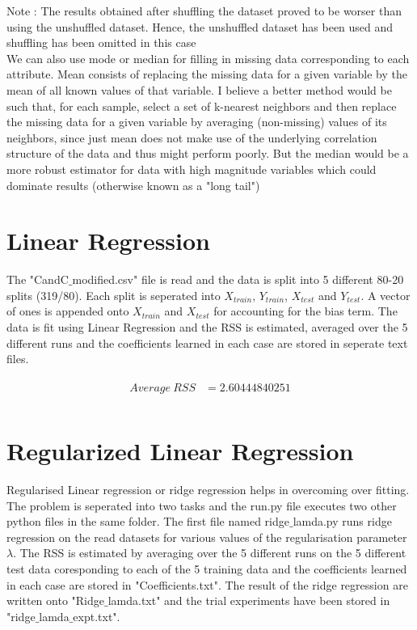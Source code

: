 \documentclass[paper=a4, fontsize=11pt]{scrartcl}
\numberwithin{equation}{section}		%
\numberwithin{figure}{section}			%
\numberwithin{table}{section}				%
\begin{document}
Note : The results obtained after shuffling the dataset proved to be worser than using the unshuffled dataset. Hence, the unshuffled dataset has been used and shuffling has been omitted in this case\\

We can also use mode or median for filling in missing data corresponding to each attribute. Mean consists of replacing the missing data for a given variable by the mean of all known values of that variable. I believe a better method would be such that, for each sample, select a set of k-nearest neighbors and then replace the missing data for a given variable by averaging (non-missing) values of its neighbors, since just mean does not make use of the underlying correlation structure of the data and thus might perform poorly. But the median would be a more robust estimator for data with high magnitude variables which could dominate results (otherwise known as a "long tail")

\section{Linear Regression}
The "CandC$\_$modified.csv" file is read and the data is split into 5 different 80-20 splits (319/80). Each split is seperated into $X_{train}$, $Y_{train}$, $X_{test}$ and $Y_{test}$. A vector of ones is appended onto $X_{train}$ and $X_{test}$ for accounting for the bias term. The data is fit using Linear Regression and the RSS is estimated, averaged over the 5 different runs and the coefficients learned in each case are stored in seperate text files.

\begin{align} 
	\begin{split}
	Average\ RSS 	&= 2.60444840251\\
	\end{split}					
\end{align}

\section{Regularized Linear Regression}

Regularised Linear regression or ridge regression helps in overcoming over fitting. The problem is seperated into two tasks and the run.py file executes two other python files in the same folder. The first file named ridge$\_$lamda.py runs ridge regression on the read datasets for various values of the regularisation parameter $\lambda$. The RSS is estimated by averaging over the 5 different runs on the 5 different test data coresponding to each of the 5 training data and the coefficients learned in each case are stored in "Coefficients.txt". The result of the ridge regression are written onto "Ridge$\_$lamda.txt" and the trial experiments have been stored in "ridge$\_$lamda$\_$expt.txt". 
\end{document}
